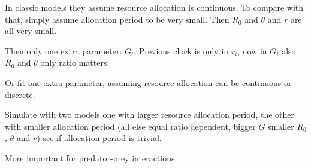 \documentclass[12pt]{article}
\begin{document}
In classic models they assume resource allocation is continuous. To compare with that, simply assume allocation period to be very small. Then $R_0$ and $\theta$ and $r$ are all very small.

 Then only one extra parameter: $G_i$. Previous clock is only in $r_i$, now in $G_i$ also. $R_0$ and $\theta$ only ratio matters.

Or fit one extra parameter, assuming resource allocation can be continuous or discrete.

Simulate with two models one with larger resource allocation period, the other with smaller allocation period (all else equal ratio dependent, bigger $G$ smaller $R_0$, $\theta$ and $r$) see if allocation period is trivial.

More important for predator-prey interactions
\end{document}
